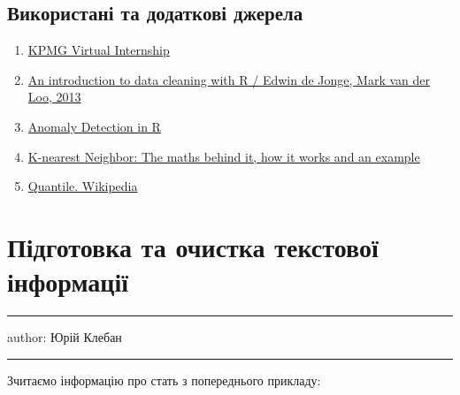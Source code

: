 \documentclass[
  letterpaper,
  DIV=11,
  numbers=noendperiod]{scrreprt}
\newenvironment{Shaded}{\begin{snugshade}}{\end{snugshade}}
\newcommand{\FunctionTok}[1]{\textcolor[rgb]{0.28,0.35,0.67}{#1}}
\newcommand{\NormalTok}[1]{\textcolor[rgb]{0.00,0.23,0.31}{#1}}
\newcommand{\OtherTok}[1]{\textcolor[rgb]{0.00,0.23,0.31}{#1}}
\newcommand{\SpecialCharTok}[1]{\textcolor[rgb]{0.37,0.37,0.37}{#1}}
\newcommand{\StringTok}[1]{\textcolor[rgb]{0.13,0.47,0.30}{#1}}
\providecommand{\tightlist}{%
  \setlength{\itemsep}{0pt}\setlength{\parskip}{0pt}}\usepackage{longtable,booktabs,array}
\begin{document}
\section{Використані та додаткові
джерела}\label{ux432ux438ux43aux43eux440ux438ux441ux442ux430ux43dux456-ux442ux430-ux434ux43eux434ux430ux442ux43aux43eux432ux456-ux434ux436ux435ux440ux435ux43bux430-1}

\begin{enumerate}
\def\labelenumi{\arabic{enumi}.}
\tightlist
\item
  \href{https://www.insidesherpa.com/virtual-internships/m7W4GMqeT3bh9Nb2c}{KPMG
  Virtual Internship}
\item
  \href{https://cran.r-project.org/doc/contrib/de_Jonge+van_der_Loo-Introduction_to_data_cleaning_with_R.pdf}{An
  introduction to data cleaning with R / Edwin de Jonge, Mark van der
  Loo, 2013}
\item
  \href{datacamp.com/courses/anomaly-detection-in-r}{Anomaly Detection
  in R}
\item
  \href{https://medium.com/analytics-vidhya/k-nearest-neighbor-the-maths-behind-it-how-it-works-and-an-example-f1de1208546c}{K-nearest
  Neighbor: The maths behind it, how it works and an example}
\item
  \href{https://en.wikipedia.org/wiki/Quantile}{Quantile. Wikipedia}
\end{enumerate}

\chapter{Підготовка та очистка текстової
інформації}\label{ux43fux456ux434ux433ux43eux442ux43eux432ux43aux430-ux442ux430-ux43eux447ux438ux441ux442ux43aux430-ux442ux435ux43aux441ux442ux43eux432ux43eux457-ux456ux43dux444ux43eux440ux43cux430ux446ux456ux457}

\begin{center}\rule{0.5\linewidth}{0.5pt}\end{center}

author: Юрій Клебан

\begin{center}\rule{0.5\linewidth}{0.5pt}\end{center}

Зчитаємо інформацію про стать з попереднього прикладу:

\begin{Shaded}
\end{Shaded}
\end{document}
